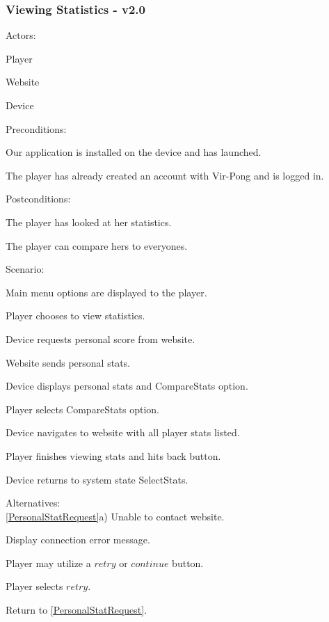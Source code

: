 \documentclass[12pt]{article}
\newenvironment{itemize*}%
  {\begin{itemize}%
  	\setlength{\parsep}{0pt}
    \setlength{\itemsep}{0pt}%
    \setlength{\parskip}{0pt}}%
  {\end{itemize}}
\newenvironment{enumerate*}%
  {\begin{enumerate}%
  	\setlength{\parsep}{0pt}
    \setlength{\itemsep}{0pt}%
    \setlength{\parskip}{0pt}}%
  {\end{enumerate}}
\begin{document}
\singlespacing
\subsubsection*{Viewing Statistics - v2.0}
Actors:
\begin{itemize*}
\item Player
\item Website
\item Device
\end{itemize*}
Preconditions:
\begin{itemize*}
\item Our application is installed on the device and has launched.
\item The player has already created an account with Vir-Pong and is logged
  in.
\end{itemize*}
Postconditions:
\begin{itemize*}
\item The player has looked at her statistics.
\item The player can compare hers to everyones.
\end{itemize*}
Scenario:
\begin{enumerate*}
\item Main menu options are displayed to the player.
\item \label{SelectStats}Player chooses to view statistics.
\item \label{PersonalStatRequest}Device requests personal score from website.
\item Website sends personal stats.
\item Device displays personal stats and CompareStats option.
\item \label{CompareStats}Player selects CompareStats option.
\item Device navigates to website with all player stats listed.
\item \label{Back}Player finishes viewing stats and hits back button.
\item Device returns to system state SelectStats.
\end{enumerate*}
Alternatives:\\
\ref{PersonalStatRequest}a) Unable to contact website.
\begin{enumerate*}
\item Display connection error message.
\item Player may utilize a $retry$ or $continue$ button.
\item Player selects $retry$.
\item Return to \ref{PersonalStatRequest}.
\end{enumerate*}
\end{document}
